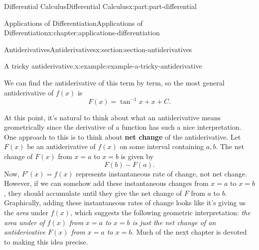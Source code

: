 \documentclass[twoside,10pt,]{book}
\newcommand{\terminology}[1]{\textbf{#1}}
\numberwithin{equation}{part}
\begin{document}
\begin{partptx}{Differential Calculus}{}{Differential Calculus}{}{}{x:part:part-differential}
\begin{chapterptx}{Applications of Differentiation}{}{Applications of Differentiation}{}{}{x:chapter:applications-differentiation}
\begin{sectionptx}{Antiderivatives}{}{Antiderivatives}{}{}{x:section:section-antiderivatives}
\begin{example}{A tricky antiderivative.}{x:example:example-a-tricky-antiderivative}
\begin{equation*}
\end{equation*}
%
\par
We can find the antiderivative of this term by term, so the most general antiderivative of \(f(x)\) is%
\begin{equation*}
F(x) = \tan^{-1}x + x + C.
\end{equation*}
%
\end{example}
At this point, it's natural to think about what an antiderivative means geometrically since the derivative of a function has such a nice interpretation. One approach to this is to think about \terminology{net change} of the antiderivative. Let \(F(x)\) be an antiderivative of \(f(x)\) on some interval containing \(a,b\). The net change of \(F(x)\) from \(x=a\) to \(x=b\) is given by%
\begin{equation*}
F(b) - F(a).
\end{equation*}
Now, \(F'(x) = f(x)\) represents instantaneous rate of change, not net change. However, if we can somehow add these instantaneous changes from \(x=a\) to \(x=b\), they should accumulate until they give the net change of \(F\) from \(a\) to \(b\). Graphically, adding these instantaneous rates of change looks like it's giving us the \emph{area} under \(f(x)\), which suggests the following geometric interpretation: \emph{the area under of \(f(x)\) from \(x=a\) to \(x=b\) is just the net change of an antiderivative \(F(x)\) from \(x=a\) to \(x=b\).} Much of the next chapter is devoted to making this idea precise.%
\end{sectionptx}
\end{chapterptx}
 \end{partptx}
%
%
\typeout{************************************************}
\typeout{************************************************}
%
\end{document}
